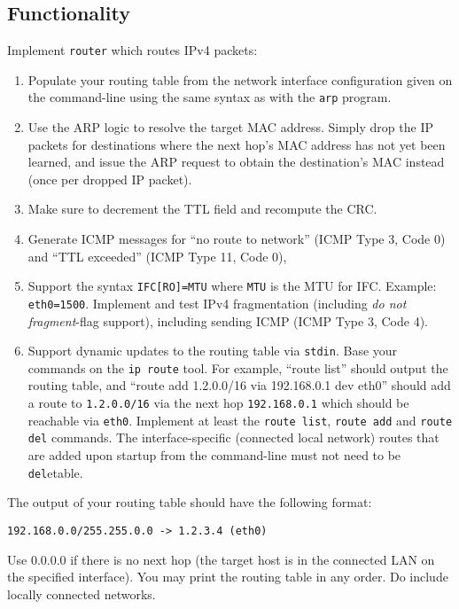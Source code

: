 \documentclass{article}
\begin{document}
\subsection{Functionality}

Implement {\tt router} which routes IPv4 packets:
\begin{enumerate}
\item Populate your routing table from the network interface configuration
  given on the command-line using the same syntax as with the {\tt arp}
  program.
\item Use the ARP logic to resolve the target MAC address.   Simply drop the IP
  packets for destinations where the next hop's MAC address has not yet been
  learned, and issue the ARP request to obtain the destination’s MAC instead
  (once per dropped IP packet).
\item Make sure to decrement the TTL field and recompute the CRC.
\item Generate ICMP messages for ``no route to network'' (ICMP
    Type 3, Code 0) and ``TTL exceeded'' (ICMP Type 11, Code 0),
\item Support the syntax {\tt IFC[RO]=MTU} where {\tt MTU} is the
  MTU for IFC.  Example: {\tt eth0=1500}.  Implement and test IPv4 fragmentation
  (including {\em do not fragment}-flag support), including sending
  ICMP  (ICMP Type 3, Code 4).
\item Support dynamic updates to the routing table via {\tt stdin}.
  Base your commands on the {\tt ip route} tool.  For example,
  ``route list'' should output the routing table, and
  ``route add 1.2.0.0/16 via 192.168.0.1 dev eth0'' should add
  a route to {\tt 1.2.0.0/16} via the next hop {\tt 192.168.0.1}
  which should be reachable via {\tt eth0}.  Implement at least
  the {\tt route list}, {\tt route add} and {\tt route del} commands.
  The interface-specific (connected local network) routes that
  are added upon startup from the command-line must not need to be
  {\tt del}etable.
\end{enumerate}

The output of your routing table should have the following format:
\begin{verbatim}
192.168.0.0/255.255.0.0 -> 1.2.3.4 (eth0)
\end{verbatim}
Use 0.0.0.0 if there is no next hop (the target host is in the connected
LAN on the specified interface).  You may print the routing table
in any order. Do include locally connected networks.
\end{document}
